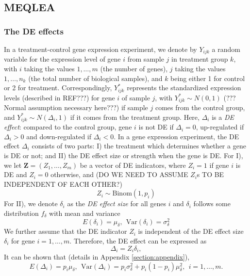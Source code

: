 \documentclass[useAMS,usenatbib, galley]{biom}
\newcommand{\OurMethod}{MEQLEA}
\begin{document}
	\subsection{\OurMethod}
	\subsubsection{The DE effects}\label{subsection:DEeffect}
	
	In a treatment-control gene expression experiment, we denote by $Y_{ijk}$ a random variable for the expression level of gene $i$ from sample $j$ in treatment group $k$, with $i$ taking the values $1, \ldots, m$ (the number of genes), $j$ taking the values $1, \ldots, n_k$ (the total number of biological samples), and $k$ being either 1 for control or 2 for treatment. Correspondingly, $Y^{\ast}_{ijk}$ represents the standardized expression levels (described in REF???) for gene $i$ of sample $j$, with $Y^{\ast}_{ijk}\sim N(0, 1)$ (??? Normal assumption necessary here???)  if sample $j$ comes from the control group, and $Y^{\ast}_{ijk}\sim N(\Delta_i, 1)$ if it comes from the treatment group. Here, $\Delta_i$ is a \textit{DE effect}: compared to the control group,  gene $i$ is not DE if $\Delta_i=0$, up-regulated if $\Delta_i >0 $ and down-regulated if $\Delta_i<0$.
	In a gene expression experiment, the DE effect $\Delta_i$ consists of two parts: I) the treatment which determines whether a gene is DE or not; and II) the DE effect size or strength when the gene is DE. 
	For I), we let $\bm Z = (Z_1, \ldots, Z_m)$ be a vector of DE indicators, where $Z_i=1$ if gene $i$ is DE and $Z_i = 0$ otherwise, and (DO WE NEED TO ASSUME $Z_i$s TO BE INDEPENDENT OF EACH OTHER?)
	\begin{equation}\label{eq:DEindicator}
	Z_i \sim \text{Binom}(1, p_i)
	\end{equation}
	For II), we denote $\delta_i$ as the \textit{DE effect size} for all genes $i$ and $\delta_i$ follows some distribution $ f_{\delta}$ with mean and variance
	\begin{equation}\label{eq:DEdistribution}
	E(\delta_i) = \mu_{\delta}, ~~\text{Var}(\delta_i) = \sigma^2_{\delta}
	\end{equation}
	We further assume that the DE indicator $Z_i$ is independent of the DE effect size $\delta_i$ for gene $i=1, \ldots, m$.  Therefore, the DE effect can be expressed as
	\begin{equation}\label{eq:DEeffect}
	\Delta_i = Z_i\delta_i,
	\end{equation}
	It can be shown that (details in Appendix \ref{section:appendix}), 
	\begin{equation}\label{eq:deltaMeanVar}
	E(\Delta_i) = p_i\mu_{\delta}, ~~  \text{Var}(\Delta_i)= p_i\sigma_{\delta}^2 + p_i(1-p_i)\mu_{\delta}^2, ~~i = 1, \ldots, m.
	\end{equation}
	
\end{document}
